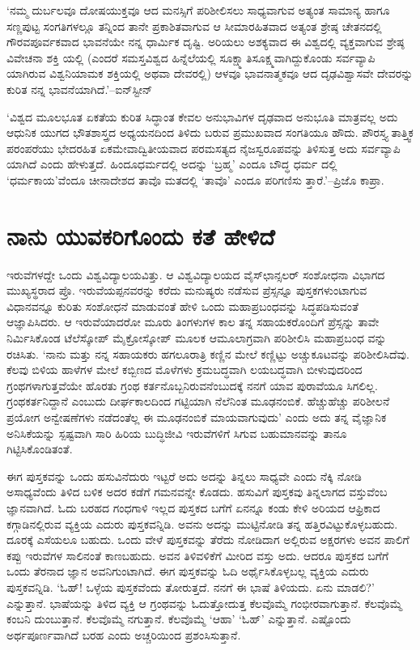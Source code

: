 ‘ನಮ್ಮ ದುರ್ಬಲವೂ ದೋಷಯುಕ್ತವೂ ಆದ ಮನಸ್ಸಿಗೆ ಪರಿಶೀಲಿಸಲು ಸಾಧ್ಯವಾಗುವ ಅತ್ಯಂತ ಸಾಮಾನ್ಯ ಹಾಗೂ ಸಣ್ಣಪುಟ್ಟ ಸಂಗತಿಗಳಲ್ಲೂ ತನ್ನಿಂದ ತಾನೇ ಪ್ರಕಾಶಿತವಾಗುವ ಆ ಸೀಮಾರಹಿತವಾದ ಅತ್ಯಂತ ಶ್ರೇಷ್ಠ ಚೇತನದಲ್ಲಿ ಗೌರವಪೂರ್ವಕವಾದ ಭಾವನೆಯೇ ನನ್ನ ಧಾರ್ಮಿಕ ದೃಷ್ಟಿ. ಅರಿಯಲು ಅಶಕ್ಯವಾದ ಈ ವಿಶ್ವದಲ್ಲಿ ವ್ಯಕ್ತವಾಗುವ ಶ್ರೇಷ್ಠ ವಿವೇಚನಾ ಶಕ್ತಿ ಯಲ್ಲಿ (ಎಂದರೆ ಸಮಸ್ತವಿಶ್ವದ ಹಿನ್ನೆಲೆಯಲ್ಲಿ ಸೂಕ್ಷ್ಮಾತಿಸೂಕ್ಷ್ಮವಾಗಿದ್ದುಕೊಂಡು ಸರ್ವವ್ಯಾಪಿ ಯಾಗಿರುವ ವಿಶ್ವನಿಯಾಮಕ ಶಕ್ತಿಯಲ್ಲಿ ಅಥವಾ ದೇವರಲ್ಲಿ) ಆಳವೂ ಭಾವನಾತ್ಮಕವೂ ಆದ ದೃಢವಿಶ್ವಾಸವೇ ದೇವರನ್ನು ಕುರಿತ ನನ್ನ ಭಾವನೆಯಾಗಿದೆ.’–ಐನ್​ಸ್ಟೀನ್

‘ವಿಶ್ವದ ಮೂಲಭೂತ ಏಕತೆಯ ಕುರಿತ ಸಿದ್ಧಾಂತ ಕೇವಲ ಅನುಭಾವಿಗಳ ದೃಢವಾದ ಅನುಭೂತಿ ಮಾತ್ರವಲ್ಲ ಅದು ಆಧುನಿಕ ಯುಗದ ಭೌತಶಾಸ್ತ್ರದ ಅಧ್ಯಯನದಿಂದ ತಿಳಿದು ಬರುವ ಪ್ರಮುಖವಾದ ಸಂಗತಿಯೂ ಹೌದು. ಪೌರಸ್ತ್ಯ ತಾತ್ತ್ವಿಕ ಪರಂಪರೆಯು ಭೇದರಹಿತ ಏಕಮೇವಾದ್ವಿತೀಯವಾದ ಪರಮಸತ್ಯದ ನೈಜಸ್ವರೂಪವನ್ನು ತಿಳಿಸುತ್ತ ಅದು ಸರ್ವವ್ಯಾಪಿ ಯಾಗಿದೆ ಎಂದು ಹೇಳುತ್ತದೆ. ಹಿಂದೂಧರ್ಮದಲ್ಲಿ ಅದನ್ನು ‘ಬ್ರಹ್ಮ’ ಎಂದೂ ಬೌದ್ಧ ಧರ್ಮ ದಲ್ಲಿ ‘ಧರ್ಮಕಾಯ’ವೆಂದೂ ಚೀನಾದೇಶದ ತಾವೊ ಮತದಲ್ಲಿ ‘ತಾವೊ’ ಎಂದೂ ಪರಿಗಣಿಸು ತ್ತಾರೆ.’–ಪ್ರಿಜೊ ಕಾಪ್ರಾ.

\section{ನಾನು ಯುವಕರಿಗೊಂದು ಕತೆ ಹೇಳಿದೆ}

ಇರುವೆಗಳದ್ದೇ ಒಂದು ವಿಶ್ವವಿದ್ಯಾಲಯವಿತ್ತು. ಆ ವಿಶ್ವವಿದ್ಯಾಲಯದ ವೈಸ್​ಛಾನ್ಸಲರ್ ಸಂಶೋಧನಾ ವಿಭಾಗದ ಮುಖ್ಯಸ್ಥರಾದ ಪ್ರೊ. ಇರುವೆಯಪ್ಪನವರನ್ನು ಕರೆದು ಮನುಷ್ಯರು ನಡೆಸುವ ಪ್ರೆಸ್ಸನ್ನೂ ಪುಸ್ತಕಗಳುಂಟಾಗುವ ವಿಧಾನವನ್ನೂ ಕುರಿತು ಸಂಶೋಧನೆ ಮಾಡುವಂತೆ ಹೇಳಿ ಒಂದು ಮಹಾಪ್ರಬಂಧವನ್ನು ಸಿದ್ಧಪಡಿಸುವಂತೆ ಆಜ್ಞಾಪಿಸಿದರು. ಆ ಇರುವೆಯಾದರೋ ಮೂರು ತಿಂಗಳುಗಳ ಕಾಲ ತನ್ನ ಸಹಾಯಕರೊಂದಿಗೆ ಪ್ರೆಸ್ಸನ್ನು ತಾವೇ ನಿರ್ಮಿಸಿಕೊಂಡ ಟೆಲೆಸ್ಕೋಪ್ ಮೈಕ್ರೋಸ್ಕೋಪ್ ಮೂಲಕ ಆಮೂಲಾಗ್ರವಾಗಿ ಪರಿಶೀಲಿಸಿ ಮಹಾಪ್ರಬಂಧ ವನ್ನು ರಚಿಸಿತು. ‘ನಾನು ಮತ್ತು ನನ್ನ ಸಹಾಯಕರು ಹಗಲೂರಾತ್ರಿ ಕಣ್ಣಿನ ಮೇಲೆ ಕಣ್ಣಿಟ್ಟು ಅಚ್ಚುಕೂಟವನ್ನು ಪರಿಶೀಲಿಸಿದೆವು. ಕೆಲವು ಬಿಳಿಯ ಹಾಳೆಗಳ ಮೇಲೆ ಕಬ್ಬಿಣದ ಮೊಳೆಗಳು ಕ್ರಮಬದ್ಧವಾಗಿ ಲಯಬದ್ಧವಾಗಿ ಬೀಳುವುದರಿಂದ ಗ್ರಂಥಗಳಾಗುತ್ತವೆಯೇ ಹೊರತು ಗ್ರಂಥ ಕರ್ತನೊಬ್ಬನಿರುವನೆಂಬುದಕ್ಕೆ ನನಗೆ ಯಾವ ಪುರಾವೆಯೂ ಸಿಗಲಿಲ್ಲ. ಗ್ರಂಥಕರ್ತನಿದ್ದಾನೆ ಎಂಬುದು ದೀರ್ಘಕಾಲದಿಂದ ಗಟ್ಟಿಯಾಗಿ ನೆಲೆನಿಂತ ಮೂಢನಂಬಿಕೆ. ಹೆಚ್ಚುಹೆಚ್ಚು ಪರಿಶೀಲನೆ ಪ್ರಯೋಗ ಅನ್ವೇಷಣೆಗಳು ನಡೆದಂತೆಲ್ಲ ಈ ಮೂಢನಂಬಿಕೆ ಮಾಯವಾಗುವುದು’ ಎಂದು ಅದು ತನ್ನ ವೈಜ್ಞಾನಿಕ ಅನಿಸಿಕೆಯನ್ನು ಸ್ಪಷ್ಟವಾಗಿ ಸಾರಿ ಹಿರಿಯ ಬುದ್ಧಿಜೀವಿ ಇರುವೆಗಳಿಗೆ ಸಿಗುವ ಬಹುಮಾನವನ್ನು ತಾನೂ ಗಿಟ್ಟಿಸಿಕೊಂಡಿತಂತೆ.

ಈಗ ಪುಸ್ತಕವನ್ನು ಒಂದು ಹಸುವಿನೆದುರು ಇಟ್ಟರೆ ಅದು ಅದನ್ನು ತಿನ್ನಲು ಸಾಧ್ಯವೇ ಎಂದು ನೆಕ್ಕಿ ನೋಡಿ ಅಸಾಧ್ಯವೆಂದು ತಿಳಿದ ಬಳಿಕ ಅದರ ಕಡೆಗೆ ಗಮನವನ್ನೇ ಕೊಡದು. ಹಸುವಿಗೆ ಪುಸ್ತಕವು ತಿನ್ನಲಾಗದ ವಸ್ತುವೆಂಬ ಜ್ಞಾನವಾಗಿದೆ. ಓದು ಬರಹದ ಗಂಧಗಾಳಿ ಇಲ್ಲದ ಪುಸ್ತಕದ ಬಗೆಗೆ ಏನನ್ನೂ ಕಂಡು ಕೇಳಿ ಅರಿಯದ ಆಫ್ರಿಕಾದ ಕಗ್ಗಾಡಿನಲ್ಲಿರುವ ವ್ಯಕ್ತಿಯ ಎದುರು ಪುಸ್ತಕವನ್ನಿಡಿ. ಅವನು ಅದನ್ನು ಮುಟ್ಟಿನೋಡಿ ತನ್ನ ಹತ್ತಿರವಿಟ್ಟುಕೊಳ್ಳಬಹುದು. ದೂರಕ್ಕೆ ಎಸೆಯಲೂ ಬಹುದು. ಒಂದು ವೇಳೆ ಪುಸ್ತಕವನ್ನು ತೆರೆದು ನೋಡಿದಾಗ ಅಲ್ಲಿರುವ ಅಕ್ಷರಗಳು ಅವನ ಪಾಲಿಗೆ ಕಪ್ಪು ಇರುವೆಗಳ ಸಾಲಿನಂತೆ ಕಾಣಬಹುದು. ಅವನ ತಿಳಿವಳಿಕೆಗೆ ಮೀರಿದ ವಸ್ತು ಅದು. ಆದರೂ ಪುಸ್ತಕದ ಬಗೆಗೆ ಒಂದು ತೆರನಾದ ಜ್ಞಾನ ಅವನಿಗುಂಟಾಗಿದೆ. ಈಗ ಪುಸ್ತಕವನ್ನು ಓದಿ ಅರ್ಥೈಸಿಕೊಳ್ಳಬಲ್ಲ ವ್ಯಕ್ತಿಯ ಎದುರು ಪುಸ್ತಕವನ್ನಿಡಿ. ‘ಓಹ್​! ಒಳ್ಳೆಯ ಪುಸ್ತಕವೆಂದು ತೋರುತ್ತದೆ. ನನಗೆ ಈ ಭಾಷೆ ತಿಳಿಯದು. ಏನು ಮಾಡಲಿ?’ ಎನ್ನುತ್ತಾನೆ. ಭಾಷೆಯನ್ನು ತಿಳಿದ ವ್ಯಕ್ತಿ ಆ ಗ್ರಂಥವನ್ನು ಓದುತ್ತೋದುತ್ತ ಕೆಲವೊಮ್ಮೆ ಗಂಭೀರವಾಗುತ್ತಾನೆ. ಕೆಲವೊಮ್ಮೆ ಕಂಬನಿ ದುಂಬುತ್ತಾನೆ. ಕೆಲವೊಮ್ಮೆ ನಗುತ್ತಾನೆ. ಕೆಲವೊಮ್ಮೆ ‘ಆಹಾ’ ‘ಓಹ್​’ ಎನ್ನುತ್ತಾನೆ. ಎಷ್ಟೊಂದು ಅರ್ಥಪೂರ್ಣವಾಗಿದೆ ಬರಹ ಎಂದು ಅಚ್ಚರಿಯಿಂದ ಪ್ರಶಂಸಿಸುತ್ತಾನೆ.

